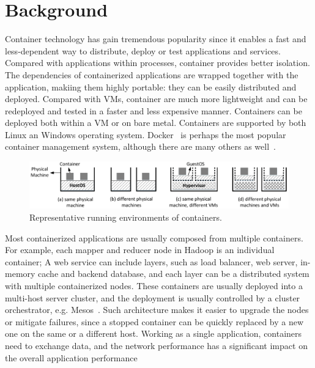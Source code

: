 \section{Background}
\label{sec:motivation}

Container technology has gain tremendous popularity since it enables a fast and
less-dependent way to distribute, deploy or test applications and services. 
Compared with applications within processes, container provides better
isolation. The dependencies of containerized applications are wrapped together
with the application, makiing them highly portable: they can be easily
distributed and deployed.  Compared with VMs, container are much more
lightweight and can be redeployed and tested in a faster and less expensive
manner. Containers can be deployed both within a VM or on bare metal. Containers
are supported by both Linux an Windows operating system.  Docker~\cite{docker} is
perhaps the most popular container management system, although there are many
others as well~\cite{coreos,kubernetes}.

\begin{figure}  
	\centering   
	\includegraphics[width=6.7in]{figures/deployment-cases.pdf}   
	\caption{\label{fig:deploy-cases} Representative running environments of containers.}   
\end{figure}

Most containerized applications are usually composed from multiple containers.
For example, each mapper and reducer node in Hadoop \cite{hadoop} is an individual container; A
web service can include layers, such as load balancer, web server, in-memory
cache and backend database, and each layer can be a distributed system with
multiple containerized nodes. These containers are usually deployed into a
multi-host server cluster, and the deployment is usually controlled by a cluster
orchestrator, e.g. Mesos~\cite{mesos}.  Such architecture makes it easier to
upgrade the nodes or mitigate failures, since a stopped container can be quickly
replaced by a new one on the same or a different host.  Working as a single
application, containers need to exchange data, and the network performance has a
significant impact on the overall application performance~\cite{coflow-etc.}

